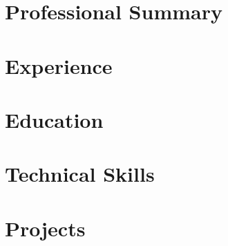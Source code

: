 \documentclass[11pt,a4paper,sans]{moderncv}
\begin{document}
\makecvtitle

\section{Professional Summary}


\section{Experience}


\section{Education}


\section{Technical Skills}


\section{Projects}


%
\end{document}
